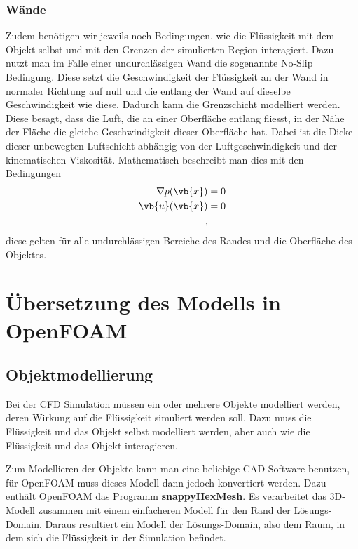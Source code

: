 \subsubsection{Wände}
Zudem benötigen wir jeweils noch Bedingungen, wie die Flüssigkeit mit dem Objekt selbst und mit den Grenzen der simulierten Region interagiert.
Dazu nutzt man im Falle einer undurchlässigen Wand die sogenannte No-Slip Bedingung. 
Diese setzt die Geschwindigkeit der Flüssigkeit an der Wand in normaler Richtung auf null und die entlang der Wand auf dieselbe Geschwindigkeit wie diese.
Dadurch kann die Grenzschicht modelliert werden. Diese besagt, dass die Luft, die an einer Oberfläche entlang fliesst, in der Nähe der Fläche die gleiche Geschwindigkeit dieser Oberfläche hat.
Dabei ist die Dicke dieser unbewegten Luftschicht abhängig von der Luftgeschwindigkeit und der kinematischen Viskosität.
Mathematisch beschreibt man dies mit den Bedingungen
\begin{align*}
 \nabla p(\vb{x}) &= 0 \\
\vb{u}(\vb{x}) &= 0 \\
,\end{align*}
diese gelten für alle undurchlässigen Bereiche des Randes und die Oberfläche des Objektes.

\section{Übersetzung des Modells in OpenFOAM}
\subsection{Objektmodellierung}
Bei der CFD Simulation müssen ein oder mehrere Objekte modelliert werden, deren Wirkung auf die Flüssigkeit simuliert werden soll. 
Dazu muss die Flüssigkeit und das Objekt selbst modelliert werden, aber auch wie die Flüssigkeit und das Objekt interagieren.

Zum Modellieren der Objekte kann man eine beliebige CAD Software benutzen, für OpenFOAM muss dieses Modell dann jedoch konvertiert werden.
Dazu enthält OpenFOAM das Programm \textbf{snappyHexMesh}.
Es verarbeitet das 3D-Modell zusammen mit einem einfacheren Modell für den Rand der Lösungs-Domain. 
Daraus resultiert ein Modell der Lösungs-Domain, also dem Raum, in dem sich die Flüssigkeit in der Simulation befindet.

